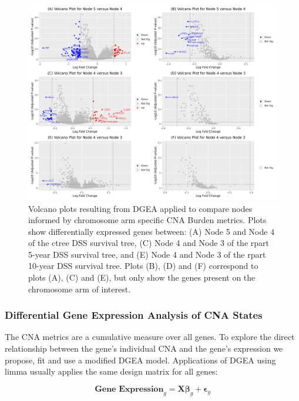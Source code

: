 \vfill
\begin{figure}[H]
\includegraphics[width=1\linewidth]{../figures/Chapter_4/Volcano_Chr_Total.png}
\caption[Volcano plots resulting from DGEA applied to compare nodes informed by chromosome arm specific CNA Burden metrics.]{Volcano plots resulting from DGEA applied to compare nodes informed by chromosome arm specific CNA Burden metrics. Plots show differentially expressed genes between: (A) Node 5 and Node 4 of the ctree DSS survival tree, (C) Node 4 and Node 3 of the rpart 5-year DSS survival tree, and (E) Node 4 and Node 3 of the rpart 10-year DSS survival tree. Plots (B), (D) and (F) correspond to plots (A), (C) and (E), but only show the genes present on the chromosome arm of interest.}
\label{fig:Volcano_chr_total}
\end{figure}
\vfill

\subsubsection{Differential Gene Expression Analysis of CNA States}
The CNA metrics are a cumulative measure over all genes. To explore the direct relationship between the gene's individual CNA and the gene's expression we propose, fit and use a modified DGEA model. Applications of DGEA using limma usually applies the same design matrix for all genes:

$$\mathbf{\text{Gene Expression}}_{g} = \mathbf{X} \mathbf{\beta}_{g} + \mathbf{\epsilon}_{g}$$ 

